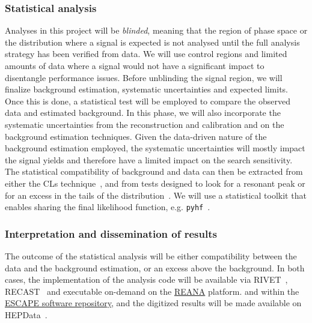 \subsubsection{Statistical analysis} Analyses in this project will be \textit{blinded}, meaning that the region of phase space or the distribution where a signal is expected is not analysed until the full analysis strategy has been verified from data. We will use control regions and limited amounts of data where a signal would not have a significant impact to disentangle performance issues. 
Before unblinding the signal region, we will finalize background estimation, systematic uncertainties and expected limits. 
Once this is done, a statistical test will be employed to compare the observed data and estimated background. In this phase, we will also incorporate the systematic uncertainties from the reconstruction and calibration and on the background estimation techniques. 
Given the data-driven nature of the background estimation employed, the systematic uncertainties will mostly impact the signal yields and therefore have a limited impact on the search sensitivity. 
The statistical compatibility of background and data can then be extracted from either the CLs technique~\cite{Read:2002hq}, %
and from tests designed to look for a resonant peak or for an excess in the tails of the distribution~\cite{Choudalakis:2011qn,Aaltonen:2008vt}. %
We will use a statistical toolkit that enables sharing the final likelihood function, e.g. \texttt{pyhf}~\cite{pyhf}. %

\subsubsection{Interpretation and dissemination of results} The outcome of the statistical analysis will be either compatibility between the data and the background estimation, or an excess above the background. In both cases, the implementation of the analysis code will be available via RIVET~\cite{Buckley:2010ar}, RECAST~\cite{Schuy:2019awp} and executable on-demand on the \href{http://reanahub.io}{REANA} platform.  
and within the \href{https://projectescape.eu/services/open-source-scientific-software-and-service-repository}{ESCAPE software repository}, 
and the digitized results will be made available on HEPData~\cite{Maguire:2017ypu}. %

